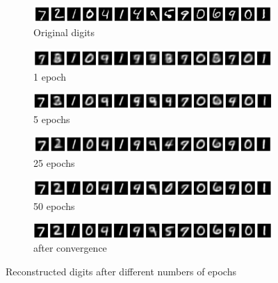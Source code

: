 \begin{figure}[H]
    \centering
    \begin{subfigure}[b]{\textwidth}
        \centering
        \includegraphics[width=\textwidth]{images/3-originalR.png}
        \caption{Original digits}
        \label{fig:originalR}
    \end{subfigure}
    \begin{subfigure}[b]{\textwidth}
        \centering
        \includegraphics[width=\textwidth]{images/3-reconstructed1.png}
        \caption{1 epoch}
        \label{fig:reconstructed1}
    \end{subfigure}
    \begin{subfigure}[b]{\textwidth}
        \centering
        \includegraphics[width=\textwidth]{images/3-reconstructed5.png}
        \caption{5 epochs}
        \label{fig:reconstructed5}
    \end{subfigure}
    \begin{subfigure}[b]{\textwidth}
        \centering
        \includegraphics[width=\textwidth]{images/3-reconstructed25.png}
        \caption{25 epochs}
        \label{fig:reconstructed25}
    \end{subfigure}
    \begin{subfigure}[b]{\textwidth}
        \centering
        \includegraphics[width=\textwidth]{images/3-reconstructed50.png}
        \caption{50 epochs}
        \label{fig:reconstructed50}
    \end{subfigure}
    \begin{subfigure}[b]{\textwidth}
        \centering
        \includegraphics[width=\textwidth]{images/3-reconstructedCon.png}
        \caption{after convergence}
        \label{fig:reconstructedCon}
    \end{subfigure}
    \caption{Reconstructed digits after different numbers of epochs}
    \label{fig:reconstructed}
\end{figure}

